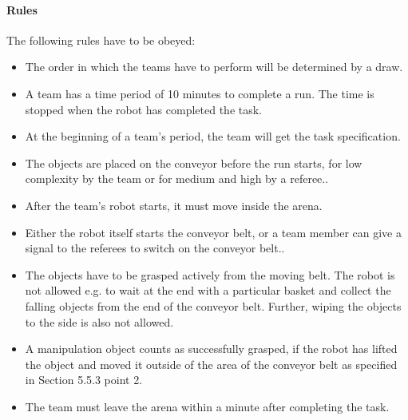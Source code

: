 \paragraph{Rules}
The following rules have to be obeyed:

\begin{itemize}
\item The order in which the teams have to perform will be determined by a draw.
\item A team has a time period of 10 minutes to complete a run. The time is stopped when the robot has completed the task.
\item At the beginning of a team’s period, the team will get the task specification.
\item The objects are placed on the conveyor before the run starts, for low complexity by the team or for medium and high by a referee..
\item After the team’s robot starts, it must move inside the arena.
\item Either the robot itself starts the conveyor belt, or a team member can give a signal to the referees to switch on the conveyor belt..
\item The objects have to be grasped actively from the moving belt. The robot is not allowed e.g. to wait at the end with a particular basket and collect the falling objects from the end of the conveyor belt. Further, wiping the objects to the side is also not allowed.
\item A manipulation object counts as successfully grasped, if the robot has lifted the object and moved it outside of the area of the conveyor belt as specified in Section 5.5.3 point 2.
\item The team must leave the arena within a minute after completing the task.
\end{itemize}



%
%
